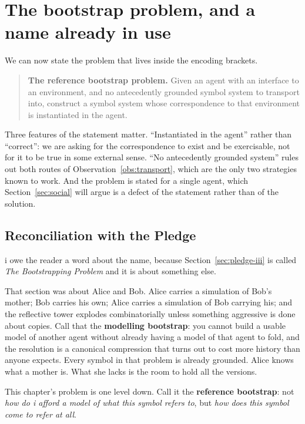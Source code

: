\section{The bootstrap problem, and a name already in use}
\label{sec:bootstrap-proper}

We can now state the problem that lives inside the encoding
brackets.

\begin{quote}
\textbf{The reference bootstrap problem.}
Given an agent with an interface to an environment, and no
antecedently grounded symbol system to transport into, construct a
symbol system whose correspondence to that environment is
instantiated in the agent.
\end{quote}

Three features of the statement matter.
``Instantiated in the agent'' rather than ``correct'': we are
asking for the correspondence to exist and be exercisable, not for
it to be true in some external sense.
``No antecedently grounded system'' rules out both routes of
Observation~\ref{obs:transport}, which are the only two strategies
known to work.
And the problem is stated for a single agent, which
Section~\ref{sec:social} will argue is a defect of the statement
rather than of the solution.

\subsection{Reconciliation with the Pledge}
\label{sec:two-bootstraps}

i owe the reader a word about the name, because
Section~\ref{sec:pledge-iii} is called \emph{The Bootstrapping
Problem} and it is about something else.

That section was about Alice and Bob.
Alice carries a simulation of Bob's mother; Bob carries his own;
Alice carries a simulation of Bob carrying his; and the reflective
tower explodes combinatorially unless something aggressive is done
about copies.
Call that the \textbf{modelling bootstrap}: you cannot build a
usable model of another agent without already having a model of
that agent to fold, and the resolution is a canonical compression
that turns out to cost more history than anyone expects.
Every symbol in that problem is already grounded.
Alice knows what a mother is.
What she lacks is the room to hold all the versions.

This chapter's problem is one level down.
Call it the \textbf{reference bootstrap}: not \emph{how do i afford
a model of what this symbol refers to}, but \emph{how does this
symbol come to refer at all}.

